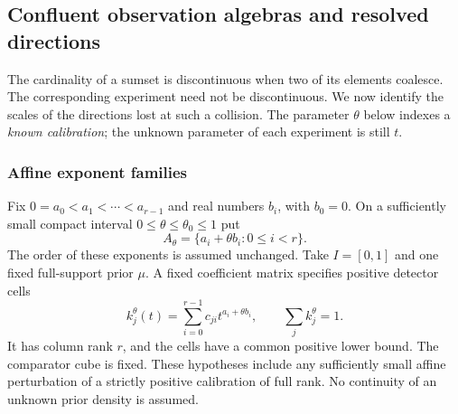 \documentclass[11pt]{amsart}
\theoremstyle{definition}\newtheorem{definition}[theorem]{Definition}
\theoremstyle{remark}\newtheorem{remark}[theorem]{Remark}
\begin{document}
\begingroup
\let\section\subsection
\let\subsection\subsubsection
\let\subsubsection\paragraph
\section{Confluent observation algebras and resolved directions}\label{sec:confluence}
The cardinality of a sumset is discontinuous when two of its elements
coalesce. The corresponding experiment need not be discontinuous. We now
identify the scales of the directions lost at such a collision. The
parameter $\theta$ below indexes a \emph{known calibration}; the unknown
parameter of each experiment is still $t$.

\subsection{Affine exponent families}
Fix $0=a_0<a_1<\cdots<a_{r-1}$ and real numbers $b_i$, with $b_0=0$.
On a sufficiently small compact interval $0\le\theta\le\theta_0\le1$ put
\[
 A_\theta=\{a_i+\theta b_i:0\le i<r\}.
\]
The order of these exponents is assumed unchanged. Take $I=[0,1]$ and
one fixed full-support prior $\mu$. A fixed coefficient matrix specifies
positive detector cells
\begin{equation}\label{eq:affine-calibration}
 k_j^\theta(t)=\sum_{i=0}^{r-1}c_{ji}t^{a_i+\theta b_i},
 \qquad \sum_jk_j^\theta=1.
\end{equation}
It has column rank $r$, and the cells have a common positive lower bound.
The comparator cube is fixed. These hypotheses include any sufficiently
small affine perturbation of a strictly positive calibration of full rank.
No continuity of an unknown prior density is assumed.
\end{document}

